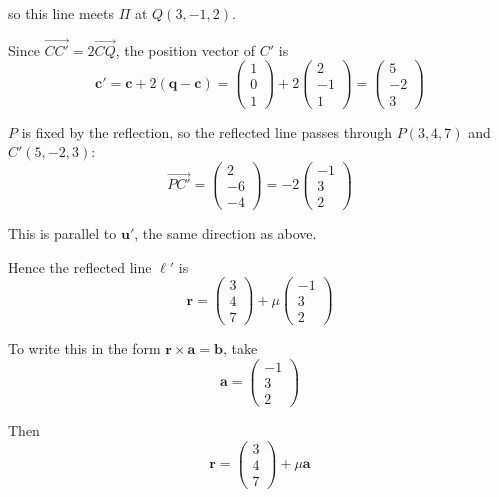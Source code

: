 \documentclass[leqno]{article}
\begin{document}
\begin{enumerate}[
  label=\textbf{\arabic*.},
  leftmargin=*,
  topsep=0pt,
  partopsep=0pt,
  parsep=0pt
]
\begin{djsSolution}
\begin{enumerate}[label=\textbf{(\alph*)}]
{  so this line meets \(\Pi\) at \(Q(3,-1,2)\).

  Since \(\overrightarrow{CC'}=2\overrightarrow{CQ}\), the position vector of \(C'\) is
  \[
  \mathbf c'=\mathbf c+2(\mathbf q-\mathbf c)=\begin{pmatrix}1\\0\\1\end{pmatrix}+2\begin{pmatrix}2\\-1\\1\end{pmatrix}=\begin{pmatrix}5\\-2\\3\end{pmatrix}
  \]

  \(P\) is fixed by the reflection, so the reflected line passes through \(P(3,4,7)\) and \(C'(5,-2,3)\):
  \[
  \overrightarrow{PC'}=\begin{pmatrix}2\\-6\\-4\end{pmatrix}=-2\begin{pmatrix}-1\\3\\2\end{pmatrix}
  \]

  This is parallel to \(\mathbf u'\), the same direction as above.
  \par}

  \vspace{8pt}
  Hence the reflected line \(\ell'\) is
  \[
  \mathbf r=\begin{pmatrix}3\\4\\7\end{pmatrix}+\mu\begin{pmatrix}-1\\3\\2\end{pmatrix}
  \]

  To write this in the form \(\mathbf r\times\mathbf a=\mathbf b\), take
  \[
  \mathbf a=\begin{pmatrix}-1\\3\\2\end{pmatrix}
  \]

  Then
  \[
  \mathbf r=\begin{pmatrix}3\\4\\7\end{pmatrix}+\mu\mathbf a
  \]


\end{enumerate}
\end{djsSolution}
\end{enumerate}
\end{document}
